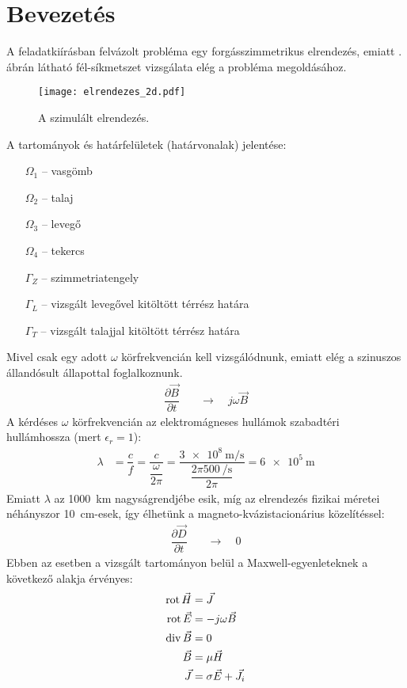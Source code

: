 \section{Bevezetés}
    A feladatkiírásban felvázolt probléma egy forgásszimmetrikus elrendezés, emiatt . ábrán látható fél-síkmetszet vizsgálata elég a probléma megoldásához.\\[1ex]

    \begin{wrapfigure}{L}{0.35\textwidth}
        \centering
        \texttt{[image: elrendezes\_2d.pdf]}
        \caption{A szimulált elrendezés.}
        \label{fig:elrendezes_2d}
    \end{wrapfigure}

 A tartományok és határfelületek (határvonalak) jelentése:
    \begin{itemize}
        \item[$\Omega_1$] -- vasgömb
        \item[$\Omega_2$] -- talaj
        \item[$\Omega_3$] -- levegő
        \item[$\Omega_4$] -- tekercs
        \item[$\Gamma_Z$] -- szimmetriatengely
        \item[$\Gamma_L$] -- vizsgált levegővel kitöltött térrész határa
        \item[$\Gamma_T$] -- vizsgált talajjal kitöltött térrész határa
    \end{itemize}

    Mivel csak egy adott $\omega$ körfrekvencián kell vizsgálódnunk, emiatt elég a szinuszos állandósult állapottal foglalkoznunk.
    \begin{align}
        \dfrac{\partial \vec{B}}{\partial t} \quad&\longrightarrow\quad j\omega\vec{B}
    \end{align}
    A kérdéses $\omega$ körfrekvencián az elektromágneses hullámok szabadtéri hullámhossza (mert $\epsilon_r = 1$):
    \begin{align}
        \lambda &= \dfrac{c}{f} = \dfrac{c}{\dfrac{\omega}{2\pi}} = \dfrac{\qty{3e8}{\metre\per\second}}{\dfrac{2\pi\qty{500}{\per\second}}{2\pi}} = \qty{6e5}{\metre}
    \end{align}
    Emiatt $\lambda$ az \qty{1000}{km} nagyságrendjébe esik, míg az elrendezés fizikai méretei néhányszor \qty{10}{cm}-esek, így élhetünk a magneto-kvázistacionárius közelítéssel:
    \begin{align}
        \dfrac{\partial \vec{D}}{\partial t} \quad&\longrightarrow\quad 0
    \end{align}
    \clearpage
    Ebben az esetben a vizsgált tartományon belül a Maxwell-egyenleteknek a következő alakja érvényes:
    \begin{align}
        \operatorname{rot} \vec{H} &= \vec{J} \\
        \operatorname{rot} \vec{E} &= -j\omega\vec{B}\\
        \operatorname{div} \vec{B} &= 0\\
        \vec{B} &= \mu\vec{H}\\
        \vec{J} &= \sigma \vec{E} + \vec{J}_i
    \end{align}

